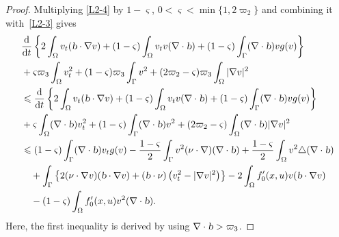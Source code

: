\documentclass{elsarticle}
\begin{document}
\begin{proof}
Multiplying \eqref{L2-4} by $1-\varsigma$, $0<\varsigma<\min\{1, 2\varpi_2\}$ and combining it with~\eqref{L2-3} gives
\begin{equation}\label{L2-5}
\begin{split}
& \frac{\mathrm{d}}{\mathrm{d}t}\left\{2\int_{\Omega}v_{t}(\textsl{b}\cdot\nabla v) + (1-\varsigma)\int_{\Omega}v_{t}v(\nabla\cdot\textsl{b} ) + (1-\varsigma)\int_{\Gamma} (\nabla\cdot \textsl{b} )vg(v)\right\} \\
&+\varsigma\varpi_3\int_{\Omega}v_{t}^2+(1-\varsigma)\varpi_3\int_{\Gamma}v^2+(2\varpi_2-\varsigma)\varpi_3\int_{\Omega}|\nabla v|^2 \\
&\leqslant \frac{\mathrm{d}}{\mathrm{d}t}\left\{2\int_{\Omega}v_{t}(\textsl{b}\cdot\nabla v) + (1-\varsigma)\int_{\Omega}v_{t}v(\nabla\cdot\textsl{b} ) + (1-\varsigma)\int_{\Gamma} (\nabla\cdot \textsl{b} )vg(v)\right\} \\
&+\varsigma\int_{\Omega}(\nabla\cdot\textsl{b} )v_{t}^2+(1-\varsigma)\int_{\Gamma}(\nabla\cdot \textsl{b} )v^2+(2\varpi_2-\varsigma)\int_{\Omega}(\nabla\cdot\textsl{b})|\nabla v|^2 \\
 &\leqslant  (1-\varsigma)\int_{\Gamma} (\nabla\cdot \textsl{b} )v_{t}g(v) -\frac{1-\varsigma}{2}\int_{\Gamma} v^2 (\nu\cdot \nabla)(\nabla\cdot \textsl{b} )+ \frac{1-\varsigma}{2}\int_{\Omega} v^2\triangle(\nabla\cdot \textsl{b} ) \\
 &\quad+\int_{\Gamma}\left\{2(\nu\cdot\nabla v)(\textsl{b}\cdot\nabla v)+(\textsl{b}\cdot\nu)\left(v_t^2-|\nabla v|^2\right)\right\}-2\int_{\Omega}f^{\prime}_0(x, u)v(\textsl{b}\cdot\nabla v)\\
 &\quad - (1-\varsigma)\int_{\Omega}f^{\prime}_0(x, u)v^2(\nabla\cdot\textsl{b} ).
\end{split}
\end{equation}
Here, the first inequality is derived by using $\nabla\cdot\textsl{b} > \varpi_3$.


\end{proof}
\end{document}
